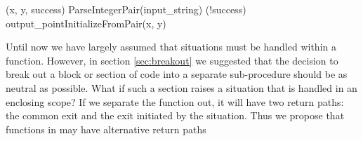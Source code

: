 \documentclass[10pt]{amsart}
\begin{document}
\begin{codex}
\begin{offsideBlue}
\begin{PVerbatim}
     (x, y, success) \cop[:=] ParseIntegerPair(input_string)
     \ckw[if] (!success)\cop[:]
        \cgoto\csituation[Fail]
     \cend
     output_point\cop[.]InitializeFromPair(x, y)
  \cend
\end{PVerbatim}
\end{offsideBlue}
%
%
\end{codex}

Until now we have largely assumed that situations must be handled
within a function.  However, in section \ref{sec:breakout} we
suggested that the decision to break out a block or section of code
into a separate sub-procedure should be as neutral as possible.  What
if such a section raises a situation that is handled in an enclosing
scope?  If we separate the function out, it will have two return
paths: the common exit and the exit initiated by the situation.  Thus
we propose that functions in \Utop may have alternative return paths
\end{document}
